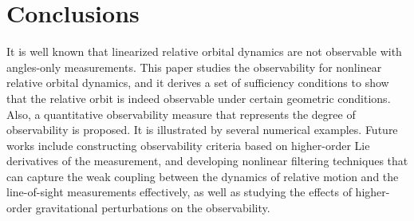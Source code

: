 %
%
%






\section{Conclusions}

It is well known that linearized relative orbital dynamics are not observable with angles-only
measurements. This paper studies the observability for nonlinear relative orbital dynamics, and it derives a set of sufficiency conditions to show that the relative orbit is indeed observable under certain geometric conditions. Also, a quantitative observability measure that represents the degree of observability is proposed. It is illustrated by several numerical examples. Future works include constructing observability criteria based on higher-order Lie derivatives of the measurement, and developing nonlinear filtering techniques that can capture the weak coupling between the dynamics of relative motion and the line-of-sight measurements effectively, as well as studying the effects of higher-order gravitational perturbations on the observability. 
























